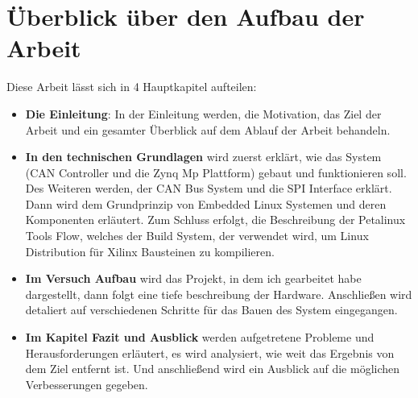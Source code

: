 \section{Überblick über den Aufbau der Arbeit}
\label{sec:Einleitung:Aufbau_der_Arbeit}

Diese Arbeit lässt sich in 4 Hauptkapitel aufteilen:
\begin{itemize}
	\item \textbf{Die Einleitung}: In der Einleitung werden, die Motivation, das Ziel der Arbeit und ein gesamter Überblick auf dem Ablauf der Arbeit behandeln.
	\item  \textbf{In den technischen Grundlagen} wird zuerst erklärt, wie das System (CAN Controller und die Zynq Mp Plattform) gebaut und funktionieren soll. Des Weiteren werden, der CAN Bus System und die SPI Interface erklärt. Dann wird dem Grundprinzip von Embedded Linux Systemen und deren Komponenten erläutert. Zum Schluss erfolgt, die Beschreibung der Petalinux Tools Flow, welches der Build System, der verwendet wird, um Linux Distribution für Xilinx Bausteinen zu kompilieren.
	\item \textbf{Im Versuch Aufbau} wird das Projekt, in dem ich gearbeitet habe dargestellt, dann folgt eine tiefe beschreibung der Hardware. Anschließen wird detaliert auf verschiedenen Schritte für das Bauen des System eingegangen. 
	\item \textbf{Im Kapitel Fazit und Ausblick} werden aufgetretene Probleme und Herausforderungen erläutert, es wird analysiert, wie weit das Ergebnis von dem Ziel entfernt ist. Und anschließend wird ein Ausblick auf die möglichen Verbesserungen gegeben. 
\end{itemize}

